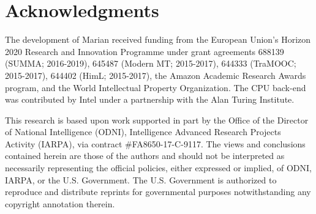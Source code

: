 \documentclass[11pt,a4paper]{article}
\begin{document}
\section*{Acknowledgments}

{\small The development of Marian received funding from the European Union's Horizon 2020 Research and Innovation Programme under grant agreements 688139 (SUMMA; 2016-2019), 645487 (Modern MT; 2015-2017), 644333 (TraMOOC; 2015-2017), 644402 (HimL; 2015-2017), the Amazon Academic Research Awards program, and the World Intellectual Property Organization. The CPU back-end was contributed by Intel under a partnership with the Alan Turing Institute. 

 This research is based upon work supported in part by the Office of the Director of National Intelligence (ODNI), Intelligence Advanced Research Projects Activity (IARPA), via contract \#FA8650-17-C-9117. The views and conclusions contained herein are those of the authors and should not be interpreted as necessarily representing the official policies, either expressed or implied, of ODNI, IARPA, or the U.S. Government. The U.S. Government is authorized to reproduce and distribute reprints for governmental purposes notwithstanding any copyright annotation therein.\par}



\end{document}
